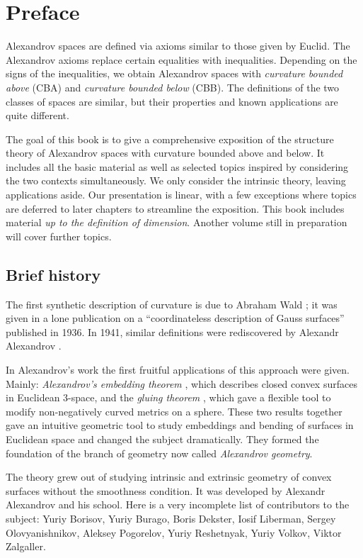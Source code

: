 \chapter*{Preface}

Alexandrov spaces are defined via axioms similar to those given by Euclid.
The Alexandrov axioms replace certain  equalities with inequalities. 
Depending on the signs of the inequalities, we obtain Alexandrov spaces with {}\emph{curvature bounded above} (CBA) and {}\emph{curvature bounded below} (CBB).
The definitions of the two classes of spaces are similar, but their properties and known applications are quite different.

The goal of this book is to give a comprehensive exposition of the structure theory of Alexandrov spaces 
with curvature bounded above and below.
It includes all the basic material as well as selected topics inspired by considering the two contexts simultaneously.
We only consider the intrinsic theory, leaving applications aside. 
Our presentation is linear,
with a few exceptions where topics are deferred to later chapters to streamline the exposition.
This book includes material \emph{up to the definition of dimension}.
Another volume still in preparation will cover further topics.


\section*{Brief history}

The first synthetic description of curvature is due to Abraham Wald \cite{wald}; 
it was given in a lone publication on a ``coordinateless description of Gauss surfaces'' published in 1936.
In 1941, similar definitions were rediscovered by Alexandr Alexandrov \cite{alexandrov:def}.

In Alexandrov's work the first fruitful applications of this approach were given.
Mainly: {}\emph{Alexandrov's embedding theorem} \cite{alexandrov-1941,alexandrov-1941convex}, which describes closed convex surfaces in Euclidean 3-space,
and the {}\emph{gluing theorem} \cite{alexandrov-1946}, which gave a flexible tool to modify non-negatively curved metrics on a sphere.
These two results together gave an intuitive geometric tool to study embeddings and bending of surfaces in Euclidean space and changed the subject dramatically.
They formed the foundation of the branch of geometry now called {}\emph{Alexandrov geometry}.


The theory grew out of studying intrinsic and extrinsic geometry of convex surfaces without the smoothness condition.
It was developed by Alexandr Alexandrov
and his school.
Here is a very incomplete list of contributors to the subject:
Yuriy  Borisov,
Yuriy  Burago,
Boris Dekster,
Iosif  Liberman,
Sergey  Olovyanishnikov,
Aleksey  Pogorelov,
Yuriy  Reshetnyak,
Yuriy  Volkov,
Viktor  Zalgaller.


